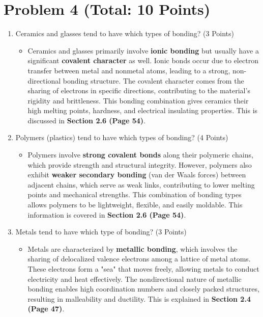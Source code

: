 \documentclass{article}
\begin{document}
\section*{Problem 4 (Total: 10 Points)}
\begin{enumerate}
	\item[(a)] Ceramics and glasses tend to have which types of bonding? (3 Points)
	      \begin{itemize}
	      	\item Ceramics and glasses primarily involve \textbf{ionic bonding} but usually have a significant \textbf{covalent character} as well. Ionic bonds occur due to electron transfer between metal and nonmetal atoms, leading to a strong, non-directional bonding structure. The covalent character comes from the sharing of electrons in specific directions, contributing to the material's rigidity and brittleness. This bonding combination gives ceramics their high melting points, hardness, and electrical insulating properties. This is discussed in \textbf{Section 2.6 (Page 54)}.
	      \end{itemize}
	      
	\item[(b)] Polymers (plastics) tend to have which types of bonding? (4 Points)
	      \begin{itemize}
	      	\item Polymers involve \textbf{strong covalent bonds} along their polymeric chains, which provide strength and structural integrity. However, polymers also exhibit \textbf{weaker secondary bonding} (van der Waals forces) between adjacent chains, which serve as weak links, contributing to lower melting points and mechanical strengths. This combination of bonding types allows polymers to be lightweight, flexible, and easily moldable. This information is covered in \textbf{Section 2.6 (Page 54)}.
	      \end{itemize}
	      
	\item[(c)] Metals tend to have which type of bonding? (3 Points)
	      \begin{itemize}
	      	\item Metals are characterized by \textbf{metallic bonding}, which involves the sharing of delocalized valence electrons among a lattice of metal atoms. These electrons form a "sea" that moves freely, allowing metals to conduct electricity and heat effectively. The nondirectional nature of metallic bonding enables high coordination numbers and closely packed structures, resulting in malleability and ductility. This is explained in \textbf{Section 2.4 (Page 47)}.
	      \end{itemize}
	      
\end{enumerate}
\end{document}
